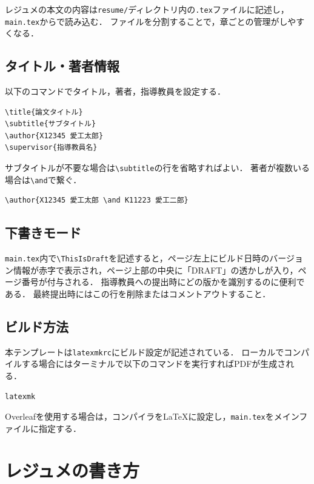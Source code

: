 レジュメの本文の内容は\texttt{resume/}ディレクトリ内の\texttt{.tex}ファイルに記述し，\texttt{main.tex}から\verb||で読み込む．
ファイルを分割することで，章ごとの管理がしやすくなる．

\subsection{タイトル・著者情報}
\label{subsec:title}
以下のコマンドでタイトル，著者，指導教員を設定する．
\begin{lstlisting}[language={[LaTeX]TeX}, numbers=none, frame=single]
\title{論文タイトル}
\subtitle{サブタイトル}
\author{X12345 愛工太郎}
\supervisor{指導教員名}
\end{lstlisting}
サブタイトルが不要な場合は\verb|\subtitle|の行を省略すればよい．
著者が複数いる場合は\verb|\and|で繋ぐ．
\begin{lstlisting}[language={[LaTeX]TeX}, numbers=none, frame=single]
\author{X12345 愛工太郎 \and K11223 愛工二郎}
\end{lstlisting}

\subsection{下書きモード}
\label{subsec:draft}
\texttt{main.tex}内で\verb|\ThisIsDraft|を記述すると，ページ左上にビルド日時のバージョン情報が赤字で表示され，ページ上部の中央に「DRAFT」の透かしが入り，ページ番号が付与される．
指導教員への提出時にどの版かを識別するのに便利である．
最終提出時にはこの行を削除またはコメントアウトすること．

\subsection{ビルド方法}
\label{subsec:build}
本テンプレートは\texttt{latexmkrc}にビルド設定が記述されている．
ローカルでコンパイルする場合にはターミナルで以下のコマンドを実行すればPDFが生成される．
\begin{lstlisting}[language=bash, numbers=none, frame=single]
latexmk
\end{lstlisting}
Overleafを使用する場合は，コンパイラをLaTeXに設定し，\texttt{main.tex}をメインファイルに指定する．

\section{レジュメの書き方}
\label{sec:writing}

